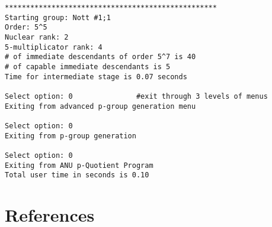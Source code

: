\documentclass[12pt]{article}
\begin{document}
\begin{verbatim}
**************************************************
Starting group: Nott #1;1
Order: 5^5
Nuclear rank: 2
5-multiplicator rank: 4
# of immediate descendants of order 5^7 is 40
# of capable immediate descendants is 5
Time for intermediate stage is 0.07 seconds

Select option: 0               #exit through 3 levels of menus
Exiting from advanced p-group generation menu

Select option: 0
Exiting from p-group generation

Select option: 0
Exiting from ANU p-Quotient Program
Total user time in seconds is 0.10
\end{verbatim}

\pagebreak
\section*{\centering References}
\end{document}
